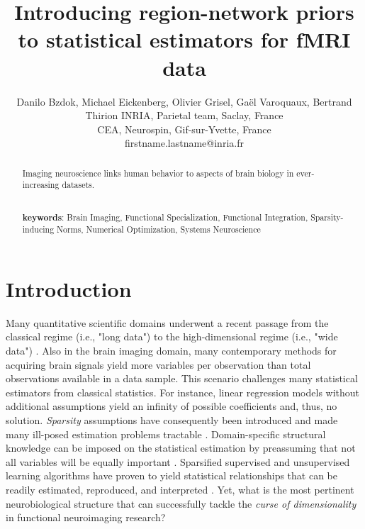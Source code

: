 \documentclass{article} %
\title{Introducing region-network priors to statistical estimators for fMRI data}
\begin{document}
\author{Danilo Bzdok, Michael Eickenberg, Olivier Grisel,
  Ga\"el Varoquaux, Bertrand Thirion
  INRIA, Parietal team, Saclay, France\\
  CEA, Neurospin, Gif-sur-Yvette, France\\
  firstname.lastname@inria.fr}

\maketitle

\begin{abstract}
Imaging neuroscience links human behavior to aspects of brain
biology in ever-increasing datasets.


\textbf{\\keywords}:
Brain Imaging, Functional Specialization, Functional Integration,
Sparsity-inducing Norms, Numerical Optimization, Systems Neuroscience

\end{abstract}



\section{Introduction}
Many quantitative scientific domains underwent a
recent passage from the classical regime (i.e., "long data")  to
the high-dimensional regime (i.e., "wide data")
\citep{jordan2015massive}.
Also in the brain imaging domain,
many contemporary methods for acquiring brain signals yield
more variables per observation than
total observations available in a data sample.
This scenario challenges many statistical estimators from
classical statistics.
For instance,
linear regression models without additional assumptions
yield an infinity of possible coefficients
and, thus, no solution.
%
\textit{Sparsity} assumptions have consequently been
introduced and made many ill-posed estimation problems tractable
\cite{buhlmann2011statistics, hastie2015statistical}.
Domain-specific structural knowledge can be imposed on the 
statistical estimation by preassuming that not all variables will be
equally important
\citep{bach2012optimization}.
Sparsified supervised and unsupervised
learning algorithms have proven to yield
statistical relationships that can be readily
estimated, reproduced, and interpreted
\cite{giraud2014introduction}.
%
Yet, what is the most pertinent neurobiological structure
that can successfully tackle the
\textit{curse of dimensionality} in
functional neuroimaging research?
\end{document}
